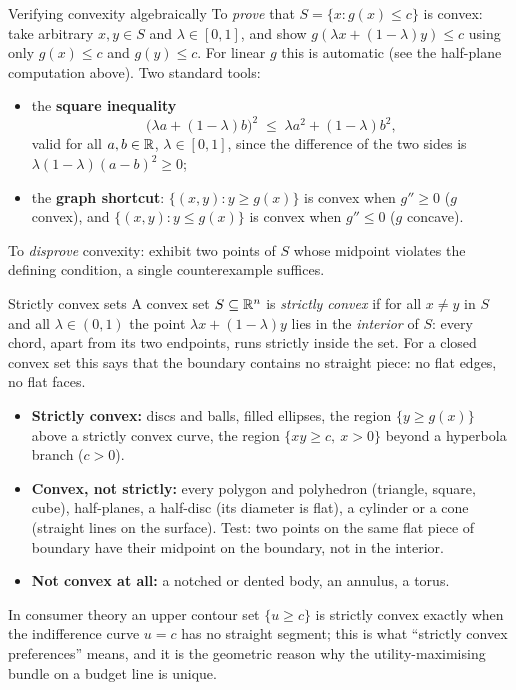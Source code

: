 \begin{rulebox}{Verifying convexity algebraically}
To \emph{prove} that $S=\{x: g(x)\le c\}$ is convex: take arbitrary $x,y\in
S$ and $\lambda\in[0,1]$, and show $g(\lambda x+(1-\lambda)y)\le c$ using
only $g(x)\le c$ and $g(y)\le c$. For linear $g$ this is automatic (see the
half-plane computation above). Two standard tools:
\begin{itemize}[leftmargin=1.6em,itemsep=0.3ex]
  \item the \textbf{square inequality}
        \[
          \bigl(\lambda a+(1-\lambda)b\bigr)^{2}
          \;\le\;\lambda a^{2}+(1-\lambda)b^{2},
        \]
        valid for all $a,b\in\mathbb{R}$, $\lambda\in[0,1]$, since the difference of
        the two sides is $\lambda(1-\lambda)(a-b)^{2}\ge 0$;
  \item the \textbf{graph shortcut}: $\{(x,y): y\ge g(x)\}$ is convex when
        $g''\ge 0$ ($g$ convex), and $\{(x,y): y\le g(x)\}$ is convex when
        $g''\le 0$ ($g$ concave).
\end{itemize}
To \emph{disprove} convexity: exhibit two points of $S$ whose midpoint
violates the defining condition, a single counterexample suffices.
\end{rulebox}

\begin{rulebox}{Strictly convex sets}
A convex set $S\subseteq\mathbb{R}^{n}$ is \emph{strictly convex}
 if for all $x\neq y$ in $S$ and all $\lambda\in(0,1)$
the point $\lambda x+(1-\lambda)y$ lies in the \emph{interior} of $S$:
every chord, apart from its two endpoints, runs strictly inside the set.
For a closed convex set this says that the boundary contains no straight
piece: no flat edges, no flat faces.
\begin{itemize}[leftmargin=1.6em,itemsep=0.3ex]
  \item \textbf{Strictly convex:} discs and balls, filled ellipses, the
        region $\{y\ge g(x)\}$ above a strictly convex curve, the region
        $\{xy\ge c,\ x>0\}$ beyond a hyperbola branch ($c>0$).
  \item \textbf{Convex, not strictly:} every polygon and polyhedron
        (triangle, square, cube), half-planes, a half-disc (its diameter is
        flat), a cylinder or a cone (straight lines on the surface). Test:
        two points on the same flat piece of boundary have their midpoint on
        the boundary, not in the interior.
  \item \textbf{Not convex at all:} a notched or dented body, an annulus,
        a torus.
\end{itemize}
In consumer theory an upper contour set $\{u\ge c\}$ is strictly convex
exactly when the indifference curve $u=c$ has no straight segment; this is
what ``strictly convex preferences'' means, and it is the geometric reason
why the utility-maximising bundle on a budget line is unique.
\end{rulebox}

